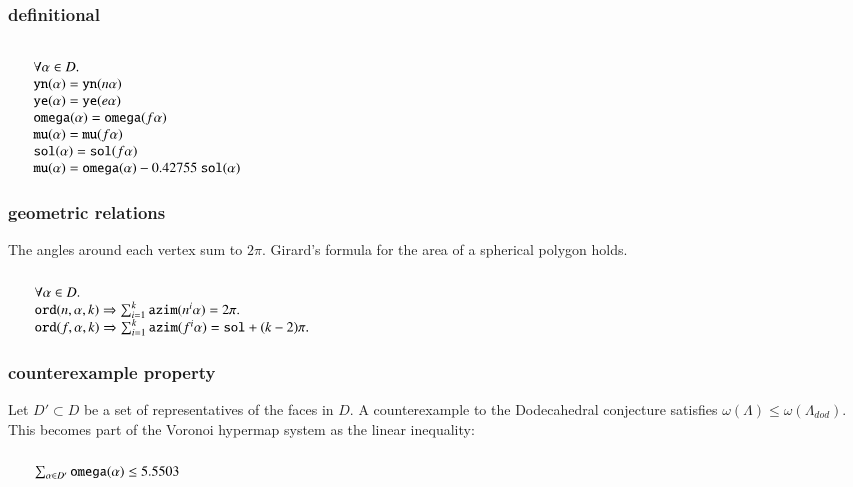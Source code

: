 \subsubsection{definitional}
$$
\begin{array}{lll}
\leftalign\\
   \forall \alpha\in D.\\
  \optt{yn}(\alpha) = \optt{yn}(n\alpha) \\
  \optt{ye}(\alpha) = \optt{ye}(e\alpha) \\
  \optt{omega}(\alpha) = \optt{omega}(f\alpha) \\
  \optt{mu}(\alpha) = \optt{mu}(f\alpha) \\
  \optt{sol}(\alpha)= \optt{sol}(f\alpha) \\
  \optt{mu}(\alpha) = \optt{omega}(\alpha) - 0.42755\ \optt{sol}(\alpha) \\
\end{array}
$$

\subsubsection{geometric relations}

The angles around each vertex sum to $2\pi$.  Girard's formula
for the area of a spherical polygon holds.
$$
\begin{array}{lll}
\leftalign\\
\forall \alpha\in D.\\ 
   \optt{ord}(n,\alpha,k) \Rightarrow
   \sum_{i=1}^k \optt{azim}(n^i\alpha )  = 2\pi.\\
   \optt{ord}(f,\alpha,k) \Rightarrow
   \sum_{i=1}^k \optt{azim}(f^i\alpha ) = \optt{sol} + (k -2)\pi.\\
   \end{array}
$$

\subsubsection{counterexample property}

\noindent
Let $D'\subset D$ be a set of representatives of the faces in $D$.
A counterexample to the Dodecahedral conjecture satisfies
$\omega(\Lambda) \le \omega(\Lambda_{dod})$.  This becomes part
of the Voronoi hypermap system as the linear inequality:
$$
\begin{array}{lll}
\leftalign\\
\sum_{\alpha\in D'} \optt{omega}(\alpha) \le 5.5503 \\
\end{array}
$$

